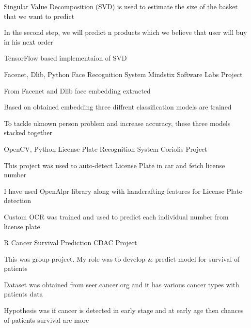 \begin{cventries}
    {} %
    {
      \begin{cvitems} %
        \item {Singular Value Decomposition (SVD) is used to estimate the size of the basket that we want to predict}
        \item {In the second step, we will predict n products which we believe that user will buy in his next order}
        \item {TensorFlow based implementaion of SVD}
      \end{cvitems}
    }
  \cventry
    {Facenet, Dlib, Python} %
    {Face Recognition System} %
    {Mindstix Software Labs Project} %
    {} %
    {
      \begin{cvitems} %
        \item {From Facenet and Dlib face embedding extracted}
        \item {Based on obtained embedding three diffrent classification models are trained }
        \item {To tackle uknown person problem and increase accuracy, these three models stacked together}
      \end{cvitems}
    }
  \cventry
    {OpenCV, Python} %
    {License Plate Recognition System} %
    {Coriolis Project} %
    {} %
    {
      \begin{cvitems} %
        \item {This project was used to auto-detect License Plate in car and fetch license number}
        \item {I have used OpenAlpr library along with handcrafting features for License Plate detection}
        \item {Custom OCR was trained and used to predict each individual number from license plate}
      \end{cvitems}
    }

  \cventry
    {R} %
    {Cancer Survival Prediction} %
    {CDAC Project} %
    {} %
    {
      \begin{cvitems} %
        \item {This was group project. My role was  to develop \& predict model for survival of patients}
        \item {Dataset was obtained from seer.cancer.org and it has various cancer types with patients data}
        \item {Hypothesis was if cancer is detected in early stage and at early age 
               then chances of patients survival are more}
      \end{cvitems}
    }


\end{cventries}
